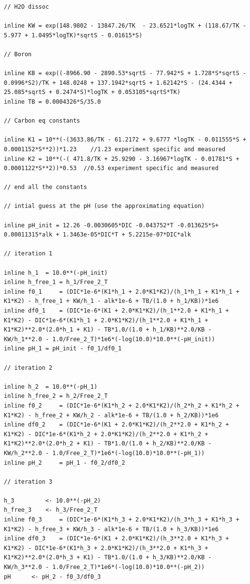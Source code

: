 \documentclass{ruthesis}
\begin{document}
\begin{lstlisting}
// H2O dissoc

inline KW = exp(148.9802 - 13847.26/TK  - 23.6521*logTK + (118.67/TK - 5.977 + 1.0495*logTK)*sqrtS - 0.01615*S)

// Boron

inline KB = exp((-8966.90 - 2890.53*sqrtS - 77.942*S + 1.728*S*sqrtS - 0.0996*S2)/TK + 148.0248 + 137.1942*sqrtS + 1.62142*S - (24.4344 + 25.085*sqrtS + 0.2474*S)*logTK + 0.053105*sqrtS*TK)
inline TB = 0.0004326*S/35.0

// Carbon eq constants

inline K1 = 10**(-(3633.86/TK - 61.2172 + 9.6777 *logTK - 0.011555*S + 0.0001152*S**2))*1.23	//1.23 experiment specific and measured 
inline K2 = 10**(-( 471.8/TK + 25.9290 - 3.16967*logTK - 0.01781*S + 0.0001122*S**2))*0.53	//0.53 experiment specific and measured

// end all the constants

// intial guess at the pH (use the approximating equation)

inline pH_init = 12.26 -0.0030605*DIC -0.043752*T -0.013625*S+ 0.00011315*alk + 1.3463e-05*DIC*T + 5.2215e-07*DIC*alk

// iteration 1

inline h_1 	= 10.0**(-pH_init)
inline h_free_1	= h_1/Free_2_T
inline f0_1 	= (DIC*1e-6*(K1*h_1 + 2.0*K1*K2)/(h_1*h_1 + K1*h_1 + K1*K2) - h_free_1 + KW/h_1 - alk*1e-6 + TB/(1.0 + h_1/KB))*1e6
inline df0_1 	= (DIC*1e-6*(K1 + 2.0*K1*K2)/(h_1**2.0 + K1*h_1 + K1*K2) - DIC*1e-6*(K1*h_1 + 2.0*K1*K2)/(h_1**2.0 + K1*h_1 + K1*K2)**2.0*(2.0*h_1 + K1) - TB*1.0/(1.0 + h_1/KB)**2.0/KB - KW/h_1**2.0 - 1.0/Free_2_T)*1e6*(-log(10.0)*10.0**(-pH_init))
inline pH_1	= pH_init - f0_1/df0_1

// iteration 2

inline h_2 	= 10.0**(-pH_1)
inline h_free_2	= h_2/Free_2_T
inline f0_2 	= (DIC*1e-6*(K1*h_2 + 2.0*K1*K2)/(h_2*h_2 + K1*h_2 + K1*K2) - h_free_2 + KW/h_2 - alk*1e-6 + TB/(1.0 + h_2/KB))*1e6
inline df0_2 	= (DIC*1e-6*(K1 + 2.0*K1*K2)/(h_2**2.0 + K1*h_2 + K1*K2) - DIC*1e-6*(K1*h_2 + 2.0*K1*K2)/(h_2**2.0 + K1*h_2 + K1*K2)**2.0*(2.0*h_2 + K1) - TB*1.0/(1.0 + h_2/KB)**2.0/KB - KW/h_2**2.0 - 1.0/Free_2_T)*1e6*(-log(10.0)*10.0**(-pH_1))
inline pH_2 	= pH_1 - f0_2/df0_2  

// iteration 3

h_3 		<- 10.0**(-pH_2)
h_free_3	<- h_3/Free_2_T
inline f0_3  	= (DIC*1e-6*(K1*h_3 + 2.0*K1*K2)/(h_3*h_3 + K1*h_3 + K1*K2) - h_free_3 + KW/h_3 - alk*1e-6 + TB/(1.0 + h_3/KB))*1e6
inline df0_3 	= (DIC*1e-6*(K1 + 2.0*K1*K2)/(h_3**2.0 + K1*h_3 + K1*K2) - DIC*1e-6*(K1*h_3 + 2.0*K1*K2)/(h_3**2.0 + K1*h_3 + K1*K2)**2.0*(2.0*h_3 + K1) - TB*1.0/(1.0 + h_3/KB)**2.0/KB - KW/h_3**2.0 - 1.0/Free_2_T)*1e6*(-log(10.0)*10.0**(-pH_2))
pH 		<- pH_2 - f0_3/df0_3  


\end{lstlisting}
\end{document}
